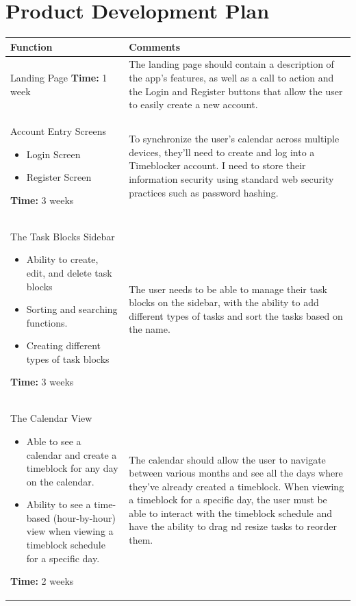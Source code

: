 \documentclass[12pt]{report}
\begin{document}
\section*{Product Development Plan}
\def\arraystretch{1.5}
\begin{tabularx}{\textwidth}{|X|X|}
  \hline
  Function
   & Comments
  \\\hline
  Landing Page
  \medskip
  \textbf{Time:} 1 week
  &
  The landing page should contain a description of the app's features, as well as a call to action and the Login and Register buttons that allow the user to easily create a new account.
  \\\hline
  Account Entry Screens
  \begin{itemize}
    \item Login Screen
    \item Register Screen
  \end{itemize}
  \textbf{Time:} 3 weeks
   &
  To synchronize the user's calendar across multiple devices, they’ll need to create and log into a Timeblocker account. I need to store their information security using standard web security practices such as password hashing.
  \\\hline
  The Task Blocks Sidebar
  \begin{itemize}
    \item Ability to create, edit, and delete task blocks
    \item Sorting and searching functions.
    \item Creating different types of task blocks
  \end{itemize}
  \textbf{Time:} 3 weeks
   &
  The user needs to be able to manage their task blocks on the sidebar, with the ability to add different types of tasks and sort the tasks based on the name.
  \\\hline
  The Calendar View
  \begin{itemize}
    \item Able to see a calendar and create a timeblock for any day on the calendar.
    \item Ability to see a time-based (hour-by-hour) view when viewing a timeblock schedule for a specific day.
  \end{itemize}
  \textbf{Time:} 2 weeks
   &
  The calendar should allow the user to navigate between various months and see all the days where they've already created a timeblock. When viewing a timeblock for a specific day, the user must be able to interact with the timeblock schedule and have the ability to drag nd resize tasks to reorder them.
  \\\hline
\end{tabularx}
\end{document}
